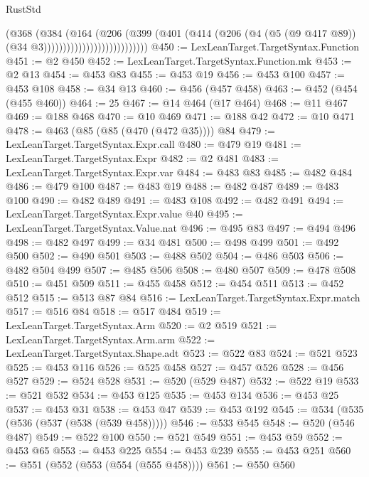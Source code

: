 \begin{lexlean}{RustStd}
\begin{coremodule}
                                      (@368
                                        (@384
                                          (@164
                                            (@206
                                              (@399
                                                (@401
                                                  (@414
                                                    (@206
                                                      (@4
                                                        (@5 (@9 @417 @89))
                                                        (@34 @3)))))))))))))))))))))))))))
@450 := LexLeanTarget.TargetSyntax.Function
@451 := @2 @450
@452 := LexLeanTarget.TargetSyntax.Function.mk
@453 := @2 @13
@454 := @453 @83
@455 := @453 @19
@456 := @453 @100
@457 := @453 @108
@458 := @34 @13
@460 := @456 (@457 @458)
@463 := @452 (@454 (@455 @460))
@464 := 25
@467 := @14 @464 (@17 @464)
@468 := @11 @467
@469 := @188 @468
@470 := @10 @469
@471 := @188 @42
@472 := @10 @471
@478 := @463 (@85 (@85 (@470 (@472 @35)))) @84
@479 := LexLeanTarget.TargetSyntax.Expr.call
@480 := @479 @19
@481 := LexLeanTarget.TargetSyntax.Expr
@482 := @2 @481
@483 := LexLeanTarget.TargetSyntax.Expr.var
@484 := @483 @83
@485 := @482 @484
@486 := @479 @100
@487 := @483 @19
@488 := @482 @487
@489 := @483 @100
@490 := @482 @489
@491 := @483 @108
@492 := @482 @491
@494 := LexLeanTarget.TargetSyntax.Expr.value @40
@495 := LexLeanTarget.TargetSyntax.Value.nat
@496 := @495 @83
@497 := @494 @496
@498 := @482 @497
@499 := @34 @481
@500 := @498 @499
@501 := @492 @500
@502 := @490 @501
@503 := @488 @502
@504 := @486 @503
@506 := @482 @504 @499
@507 := @485 @506
@508 := @480 @507
@509 := @478 @508
@510 := @451 @509
@511 := @455 @458
@512 := @454 @511
@513 := @452 @512
@515 := @513 @87 @84
@516 := LexLeanTarget.TargetSyntax.Expr.match
@517 := @516 @84
@518 := @517 @484
@519 := LexLeanTarget.TargetSyntax.Arm
@520 := @2 @519
@521 := LexLeanTarget.TargetSyntax.Arm.arm
@522 := LexLeanTarget.TargetSyntax.Shape.adt
@523 := @522 @83
@524 := @521 @523
@525 := @453 @116
@526 := @525 @458
@527 := @457 @526
@528 := @456 @527
@529 := @524 @528
@531 := @520 (@529 @487)
@532 := @522 @19
@533 := @521 @532
@534 := @453 @125
@535 := @453 @134
@536 := @453 @25
@537 := @453 @31
@538 := @453 @47
@539 := @453 @192
@545 := @534 (@535 (@536 (@537 (@538 (@539 @458)))))
@546 := @533 @545
@548 := @520 (@546 @487)
@549 := @522 @100
@550 := @521 @549
@551 := @453 @59
@552 := @453 @65
@553 := @453 @225
@554 := @453 @239
@555 := @453 @251
@560 := @551 (@552 (@553 (@554 (@555 @458))))
@561 := @550 @560

\end{coremodule}
\end{lexlean}
